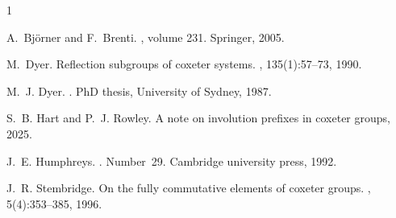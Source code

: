 \documentclass{amsart}
\theoremstyle{plain} %
\theoremstyle{definition}
\begin{document}
\begin{thebibliography}{1}

A.~Bj{\"o}rner and F.~Brenti.
, volume 231.
\newblock Springer, 2005.

M.~Dyer.
\newblock Reflection subgroups of coxeter systems.
, 135(1):57--73, 1990.

M.~J. Dyer.
.
\newblock PhD thesis, University of Sydney, 1987.

S.~B. Hart and P.~J. Rowley.
\newblock A note on involution prefixes in coxeter groups, 2025.

J.~E. Humphreys.
.
\newblock Number~29. Cambridge university press, 1992.

J.~R. Stembridge.
\newblock On the fully commutative elements of coxeter groups.
, 5(4):353--385, 1996.

\end{thebibliography}
\end{document}
